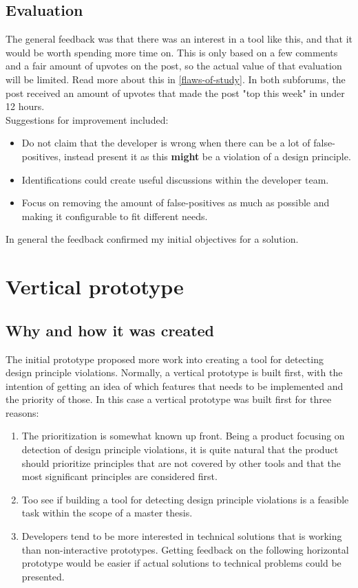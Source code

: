 \documentclass{report}
\begin{document}
\subsection*{Evaluation}
The general feedback was that there was an interest in a tool like this, and that it would be worth spending more time on. This is only based on a few comments and a fair amount of upvotes on the post, so the actual value of that evaluation will be limited. Read more about this in \ref{flaws-of-study}. In both subforums, the post received an amount of upvotes that made the post "top this week" in under 12 hours. \\

Suggestions for improvement included: 
\begin{itemize}
    \item Do not claim that the developer is wrong when there can be a lot of false-positives, instead present it as this \textbf{might} be a violation of a design principle.
    \item Identifications could create useful discussions within the developer team.
    \item Focus on removing the amount of false-positives as much as possible and making it configurable to fit different needs.
\end{itemize}

In general the feedback confirmed my initial objectives for a solution.

\section{Vertical prototype}

\subsection*{Why and how it was created}
The initial prototype proposed more work into creating a tool for detecting design principle violations. Normally, a vertical prototype is built first, with the intention of getting an idea of which features that needs to be implemented and the priority of those. In this case a vertical prototype was built first for three reasons:

\begin{enumerate}
    \item The prioritization is somewhat known up front. Being a product focusing on detection of design principle violations, it is quite natural that the product should prioritize principles that are not covered by other tools and that the most significant principles are considered first.
    \item Too see if building a tool for detecting design principle violations is a feasible task within the scope of a master thesis.
    \item Developers tend to be more interested in technical solutions that is working than non-interactive prototypes. Getting feedback on the following horizontal prototype would be easier if actual solutions to technical problems could be presented.
\end{enumerate}
\end{document}
